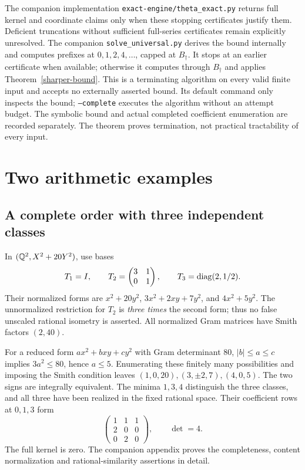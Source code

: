 \documentclass[11pt]{article}
\theoremstyle{remark}\newtheorem{remark}[theorem]{Remark}
\begin{document}
The companion implementation \texttt{exact-engine/theta\_exact.py} returns
full kernel and coordinate claims only when these stopping certificates
justify them. Deficient truncations without sufficient full-series
certificates remain explicitly unresolved. The companion \texttt{solve\_universal.py} derives the bound internally
and computes prefixes at $0,1,2,4,\ldots$, capped at $B_\dagger$. It stops at
an earlier certificate when available; otherwise it computes through
$B_\dagger$ and applies Theorem~\ref{sharper-bound}. This is a terminating algorithm
on every valid finite input and accepts no externally asserted bound.
Its default command only inspects the bound; \texttt{--complete} executes
the algorithm without an attempt budget. The symbolic bound and actual
completed coefficient enumeration are recorded separately. The theorem
proves termination, not practical tractability of every input.

\section{Two arithmetic examples}
\subsection{A complete order with three independent classes}
In $(\mathbb Q^2,X^2+20Y^2)$, use bases
\[
 T_1=I,\qquad T_2=\begin{pmatrix}3&1\\0&1\end{pmatrix},\qquad
 T_3=\operatorname{diag}(2,1/2).
\]
Their normalized forms are
$x^2+20y^2$, $3x^2+2xy+7y^2$, and $4x^2+5y^2$.
The unnormalized restriction for $T_2$ is \emph{three times} the second
form; thus no false unscaled rational isometry is asserted.
All normalized Gram matrices have Smith factors $(2,40)$.

For a reduced form $ax^2+bxy+cy^2$ with Gram determinant $80$,
$|b|\leq a\leq c$ implies $3a^2\leq80$, hence $a\leq5$.
Enumerating these finitely many possibilities and imposing the Smith
condition leaves $(1,0,20),(3,\pm2,7),(4,0,5)$. The two signs are
integrally equivalent. The minima $1,3,4$ distinguish the three classes,
and all three have been realized in the fixed rational space. Their
coefficient rows at $0,1,3$ form
\[
 \begin{pmatrix}1&1&1\\2&0&0\\0&2&0\end{pmatrix},
 \qquad\det=4.
\]
The full kernel is zero. The companion appendix proves the completeness,
content normalization and rational-similarity assertions in detail.
\end{document}
